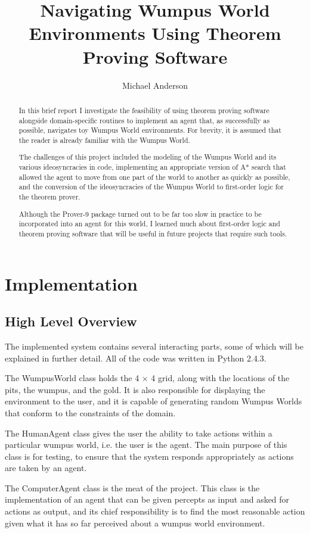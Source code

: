 \documentclass[10 pt.]{article}
\author{Michael Anderson}
\title{Navigating Wumpus World Environments Using Theorem Proving Software}
\begin{document}
\maketitle
\begin{abstract}
In this brief report I investigate the feasibility of using theorem proving
software alongside domain-specific routines to implement an agent that, as
successfully as possible, navigates toy Wumpus World environments. For brevity,
it is assumed that the reader is already familiar with the Wumpus World.

The challenges of this project included the modeling of the Wumpus World and
its various ideosyncracies in code, implementing an appropriate version of A*
search that allowed the agent to move from one part of the world to another as
quickly as possible, and the conversion of the ideosyncracies of the Wumpus
World to first-order logic for the theorem prover.

Although the Prover-9 package turned out to be far too slow in practice to be
incorporated into an agent for this world, I learned much about first-order logic and
theorem proving software that will be useful in future projects that require
such tools.
\end{abstract}
\newpage
\section{Implementation}
\subsection{High Level Overview}
The implemented system contains several interacting parts, some of which will
be explained in further detail. All of the code was written in Python 2.4.3.

The WumpusWorld class holds the 4 $\times$ 4
grid, along with the locations of the pits, the wumpus, and the gold. It is
also responsible for displaying the environment to the user, and it is
capable of generating random Wumpus Worlds that conform to the constraints of
the domain.

The HumanAgent class gives the user the ability to take actions
within a particular wumpus world, i.e. the user is the agent. The main purpose
of this class is for testing, to ensure that the system responds appropriately
as actions are taken by an agent.

The ComputerAgent class is the meat of the project. This class is the
implementation of an agent that can be given percepts as input and asked for
actions as output, and its chief responsibility is to find the
most reasonable action given what it has so far perceived about a wumpus world
environment.
\end{document}
